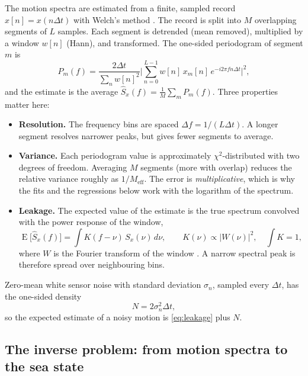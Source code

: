 \documentclass[11pt,a4paper]{article}
\begin{document}
The motion spectra are estimated from a finite, sampled record $x[n] = x(n\Delta t)$ with
Welch's method \citep{welch1967}. The record is split into $M$ overlapping segments of $L$
samples. Each segment is detrended (mean removed), multiplied by a window $w[n]$ (Hann), and
transformed. The one-sided periodogram of segment $m$ is
\begin{equation}
  P_m(f) = \frac{2\Delta t}{\sum_n w[n]^2}
           \Big| \sum_{n=0}^{L-1} w[n]\, x_m[n]\, e^{-i 2\pi f n \Delta t} \Big|^2,
\end{equation}
and the estimate is the average $\hat S_x(f) = \frac{1}{M}\sum_m P_m(f)$. Three properties
matter here:
\begin{itemize}
  \item \textbf{Resolution.} The frequency bins are spaced $\Delta f = 1/(L\Delta t)$. A longer
        segment resolves narrower peaks, but gives fewer segments to average.
  \item \textbf{Variance.} Each periodogram value is approximately $\chi^2$-distributed with two
        degrees of freedom. Averaging $M$ segments (more with overlap) reduces the relative
        variance roughly as $1/M_{\text{eff}}$. The error is \emph{multiplicative}, which is
        why the fits and the regressions below work with the logarithm of the spectrum.
  \item \textbf{Leakage.} The expected value of the estimate is the true spectrum convolved
        with the power response of the window,
        \begin{equation}
          \operatorname{E}\big[\hat S_x(f)\big] = \int K(f - \nu)\, S_x(\nu)\, d\nu,
          \qquad
          K(\nu) \propto |W(\nu)|^2,
          \quad \int K = 1,
          \label{eq:leakage}
        \end{equation}
        where $W$ is the Fourier transform of the window \citep{harris1978}. A narrow
        spectral peak is therefore spread over neighbouring bins.
\end{itemize}
Zero-mean white sensor noise with standard deviation $\sigma_n$, sampled every $\Delta t$, has
the one-sided density
\begin{equation}
  N = 2\sigma_n^2 \Delta t,
  \label{eq:noise}
\end{equation}
so the expected estimate of a noisy motion is \cref{eq:leakage} plus $N$.

\subsection{The inverse problem: from motion spectra to the sea state}
\label{sec:inverse}
\end{document}
